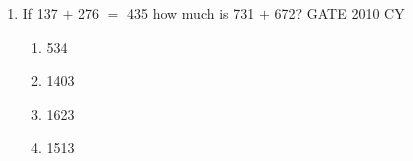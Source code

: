 \documentclass[journal,12pt,onecolumn]{IEEEtran}
\theoremstyle{remark}
\begin{document}
\begin{enumerate}
\item If 137 $+$ 276 $=$ 435 how much is 731 $+$ 672?
\hfill{GATE 2010 CY}

\begin{multicols}{2}
\begin{enumerate}
    \item 534
    \item 1403
    \item 1623
    \item 1513
\end{enumerate}
\end{multicols}

























































































    
\end{enumerate}
\end{document}
